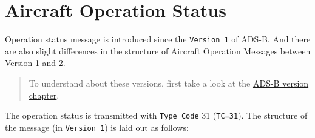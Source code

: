 \section{Aircraft Operation Status}\label{aircraft-operation-status}

Operation status message is introduced since the \texttt{Version\ 1} of ADS-B. And there are also slight differences in the structure of Aircraft Operation Messages between Version 1 and 2.

\begin{quote}
To understand about these versions, first take a look at the \href{version.html}{ADS-B version chapter}.
\end{quote}

The operation status is transmitted with \texttt{Type\ Code} 31 (\texttt{TC=31}). The structure of the message (in \texttt{Version\ 1}) is laid out as follows:

